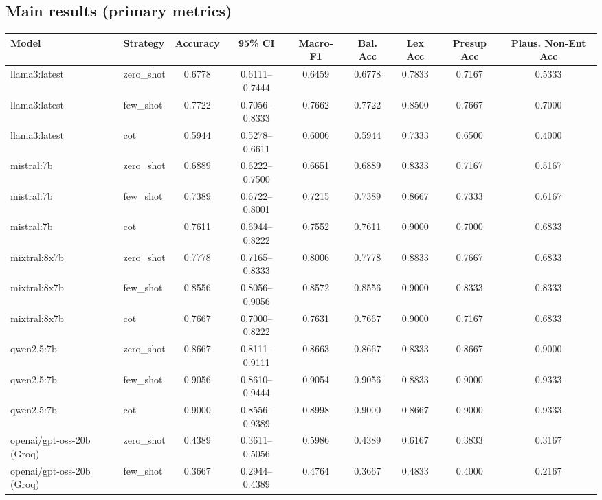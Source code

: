 \documentclass[11pt, a4paper]{article}
\begin{document}
\subsection*{\color{bambergnavy} Main results (primary metrics)}
\begin{table}[htbp]
\centering
\scriptsize
\setlength{\tabcolsep}{3.5pt}
\renewcommand{\arraystretch}{1.22}
\begin{tabularx}{\textwidth}{>{\raggedright\arraybackslash}X l c c c c c c c}
\toprule
\rowcolor{labeltint}
\textbf{Model} & \textbf{Strategy} & \textbf{Accuracy} & \textbf{95\% CI} & \textbf{Macro-F1} & \textbf{Bal. Acc} & \textbf{Lex Acc} & \textbf{Presup Acc} & \textbf{Plaus. Non-Ent Acc} \\
\midrule
llama3:latest & zero\_shot & 0.6778 & 0.6111--0.7444 & 0.6459 & 0.6778 & 0.7833 & 0.7167 & 0.5333 \\
llama3:latest & few\_shot & 0.7722 & 0.7056--0.8333 & 0.7662 & 0.7722 & 0.8500 & 0.7667 & 0.7000 \\
llama3:latest & cot & 0.5944 & 0.5278--0.6611 & 0.6006 & 0.5944 & 0.7333 & 0.6500 & 0.4000 \\
\midrule
mistral:7b & zero\_shot & 0.6889 & 0.6222--0.7500 & 0.6651 & 0.6889 & 0.8333 & 0.7167 & 0.5167 \\
mistral:7b & few\_shot & 0.7389 & 0.6722--0.8001 & 0.7215 & 0.7389 & 0.8667 & 0.7333 & 0.6167 \\
mistral:7b & cot & 0.7611 & 0.6944--0.8222 & 0.7552 & 0.7611 & 0.9000 & 0.7000 & 0.6833 \\
\midrule
mixtral:8x7b & zero\_shot & 0.7778 & 0.7165--0.8333 & 0.8006 & 0.7778 & 0.8833 & 0.7667 & 0.6833 \\
mixtral:8x7b & few\_shot & 0.8556 & 0.8056--0.9056 & 0.8572 & 0.8556 & 0.9000 & 0.8333 & 0.8333 \\
mixtral:8x7b & cot & 0.7667 & 0.7000--0.8222 & 0.7631 & 0.7667 & 0.9000 & 0.7167 & 0.6833 \\
\midrule
qwen2.5:7b & zero\_shot & 0.8667 & 0.8111--0.9111 & 0.8663 & 0.8667 & 0.8333 & 0.8667 & 0.9000 \\
qwen2.5:7b & few\_shot & 0.9056 & 0.8610--0.9444 & 0.9054 & 0.9056 & 0.8833 & 0.9000 & 0.9333 \\
qwen2.5:7b & cot & 0.9000 & 0.8556--0.9389 & 0.8998 & 0.9000 & 0.8667 & 0.9000 & 0.9333 \\
\midrule
openai/gpt-oss-20b (Groq) & zero\_shot & 0.4389 & 0.3611--0.5056 & 0.5986 & 0.4389 & 0.6167 & 0.3833 & 0.3167 \\
openai/gpt-oss-20b (Groq) & few\_shot & 0.3667 & 0.2944--0.4389 & 0.4764 & 0.3667 & 0.4833 & 0.4000 & 0.2167 \\

\end{tabularx}
\end{table}
\end{document}
